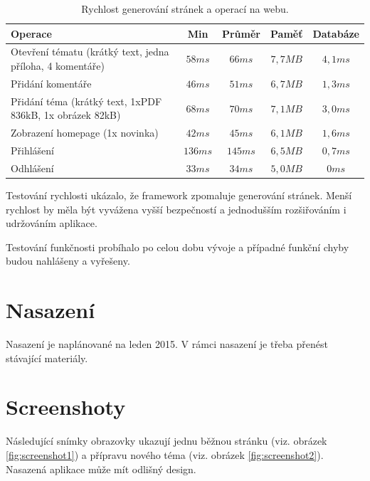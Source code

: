 \documentclass[thesis=B,czech]{FITthesis}[2012/06/26]
\begin{document}
\begin{table}
\centering
\begin{tabular}{| p{5cm} | c | c | c | c |}
  \hline
    \bfseries Operace & \bfseries Min & \bfseries Průměr & \bfseries Paměť & \bfseries Databáze \\
    \hline \hline

   Otevření tématu (krátký text, jedna příloha, 4 komentáře) & $58 ms$ & $66 ms$  & $7,7 MB$ & $4,1 ms$ \\
   \hline
   Přidání komentáře & $46ms$ &$ 51ms$  & $6,7MB$ & $1,3ms$ \\
   \hline
   Přidání téma (krátký text, 1xPDF 836kB, 1x obrázek 82kB) & $68ms$ &$ 70ms$  & $7,1MB$ & $3,0ms$ \\
   \hline
   Zobrazení homepage (1x novinka) & $42ms$ &$ 45ms$  & $6,1MB$ & $1,6ms$ \\
   \hline
   Přihlášení & $136ms$ &$ 145ms$  & $6,5MB$ & $0,7ms$ \\
   \hline
   Odhlášení & $33ms$ &$ 34ms$  & $5,0MB$ & $0ms$ \\

\hline    
\end{tabular}
\caption[Rychlost operací na webu.]{Rychlost generování stránek a operací na webu.}
\label{table:tests}
\end{table}

Testování rychlosti ukázalo, že framework zpomaluje generování stránek. Menší rychlost by měla být vyvážena vyšší bezpečností a jednodušším rozšiřováním i udržováním aplikace.

Testování funkčnosti probíhalo po celou dobu vývoje a případné funkční chyby budou nahlášeny a vyřešeny.

\section{Nasazení}

Nasazení je naplánované na leden 2015. V rámci nasazení je třeba přenést stávající materiály.

\section{Screenshoty}

Následující snímky obrazovky ukazují jednu běžnou stránku (viz. obrázek \ref{fig:screenshot1}) a přípravu nového téma (viz. obrázek \ref{fig:screenshot2}). Nasazená aplikace může mít odlišný design.
\end{document}
